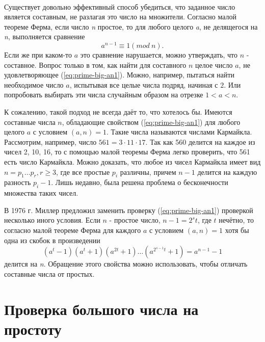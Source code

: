 
\paragraph{} Существует довольно эффективный способ убедиться, что заданное число является составным, не разлагая это число на множители. 
Согласно малой теореме Ферма, если число \textit{n} простое, то для любого целого \textit{a}, не делящегося на \textit{n}, выполняется сравнение
\begin{equation} \label{eq:prime-big-an1}
 a^{ n-1} \equiv 1 (mod \: n).
\end{equation}
Если же при каком-то {$a$} это сравнение нарушается, можно утверждать, что {$n$} - составное. Вопрос только в том, как найти для составного {$n$}
целое число {$a$}, не удовлетворяющее (\ref{eq:prime-big-an1}). Можно, например, пытаться найти необходимое число {$a$}, испытывая все целые числа подряд, 
начиная с {$2$}. Или попробовать выбирать эти числа случайным образом на отрезке {$1 < a < n$}.

  К сожалению, такой подход не всегда даёт то, что хотелось бы. Имеются составные числа {$n$}, обладающие свойством (\ref{eq:prime-big-an1}) для любого целого
{$a$} с условием {$(a, n) = 1$}. Такие числа называются числами Кармайкла. Рассмотрим, например, число {$561 = 3 \cdot 11 \cdot 17$}. 
Так как 560 делится на каждое из чисел 2, 10, 16, то с помощью малой теоремы Ферма легко проверить, что 561 есть число Кармайкла. 
Можно доказать, что любое из чисел Кармайкла имеет вид {$n = p_{1} \dots p_{r}, r \geq 3$}, 
где все простые {$p_{i}$} различны, причем {$n - 1$} делится на каждую разность {$p_{i} - 1$}. 
Лишь недавно, была решена проблема о бесконечности множества таких чисел.

  В 1976 г. Миллер предложил заменить проверку (\ref{eq:prime-big-an1}) проверкой несколько иного условия. Если {$n$} - простое число, 
{$n - 1 = 2^{ s} t$}, где {$t$} нечётно, то согласно малой теореме Ферма для каждого {$a$} с 
условием {$(a, n) = 1$} хотя бы одна из скобок в произведении
\begin{equation} \label{eq:prime-big-at1}
 (a^{ t} - 1)(a^{ t} + 1)(a^{ 2 t} + 1) \dots (a^{ 2^{ s - 1}t} + 1) = a^{ n - 1} - 1
\end{equation}
делится на \textit{n}. Обращение этого свойства можно использовать, чтобы отличать составные числа от простых.

\section{Проверка большого числа на простоту}

